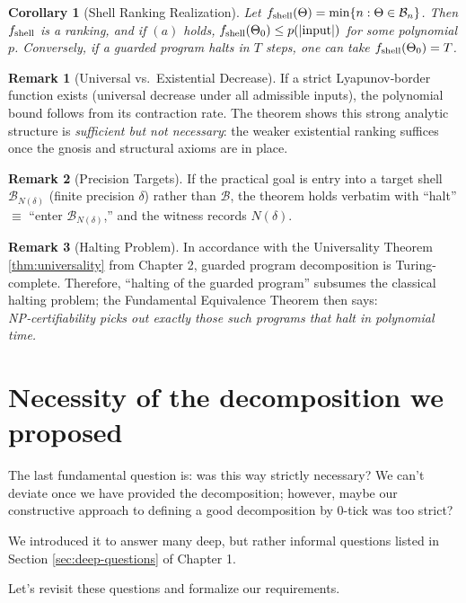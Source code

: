 \documentclass[12pt]{article}
\theoremstyle{definition}
\newtheorem{remark}{Remark}[section]
\theoremstyle{plain}
\newtheorem{corollary}{Corollary}[section]
\begin{document}
\begin{corollary}[Shell Ranking Realization]
Let $f_{\rm shell}(\Theta)=\min\{n:\Theta\in\mathcal B_n\}$.  
Then $f_{\rm shell}$ is a ranking, and if $(a)$ holds, $f_{\rm shell}(\Theta_0)\le p(|\mathrm{input}|)$ for some polynomial $p$.  Conversely, if a guarded program halts in $T$ steps, one can take $f_{\rm shell}(\Theta_0)=T$.
\end{corollary}

\begin{remark}[Universal vs.\ Existential Decrease]
If a strict Lyapunov‑border function exists (universal decrease under all admissible inputs), the polynomial bound follows from its contraction rate.  The theorem shows this strong analytic structure is \emph{sufficient but not necessary}: the weaker existential ranking suffices once the gnosis and structural axioms are in place.
\end{remark}

\begin{remark}[Precision Targets]
If the practical goal is entry into a target shell $\mathcal B_{N(\delta)}$ (finite precision $\delta$) rather than $\mathcal B$, the theorem holds verbatim with “halt” $\equiv$ “enter $\mathcal B_{N(\delta)}$,” and the witness records $N(\delta)$.
\end{remark}
\begin{remark}[Halting Problem]
In accordance with the Universality Theorem \ref{thm:universality} from Chapter 2, guarded program decomposition is Turing-complete. Therefore, “halting of the guarded program” subsumes the classical halting problem; the Fundamental Equivalence Theorem then says: \emph{NP‑certifiability picks out exactly those such programs that halt in polynomial time.}
    
\end{remark}

\section{Necessity of the decomposition we proposed}
The last fundamental question is: was this way strictly necessary? We can't deviate once we have provided the decomposition; however, maybe our constructive approach to defining a good decomposition by 0-tick was too strict? 

We introduced it to answer many deep, but rather informal questions listed in Section \ref{sec:deep-questions} of Chapter 1.

Let's revisit these questions and formalize our requirements.
\end{document}
